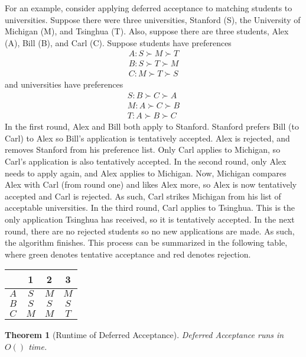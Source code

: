 \documentclass[dvipsnames]{article}
\newtheorem{theorem}{Theorem}[section]
\theoremstyle{definition}
\theoremstyle{remark}
\begin{document}
For an example, consider applying deferred acceptance to matching students to universities. Suppose there were three universities, Stanford (S), the University of Michigan (M), and Tsinghua (T). Also, suppose there are three students, Alex (A), Bill (B), and Carl (C).  Suppose students have preferences
\begin{align*}
	A: S \succ M \succ T \\
	B: S \succ T \succ M \\
	C: M \succ T \succ S
\end{align*}
and universities have preferences
\begin{align*}
	S: B \succ C \succ A \\
	M: A \succ C \succ B \\
	T: A \succ B \succ C
\end{align*}
In the first round, Alex and Bill both apply to Stanford. Stanford prefers Bill (to Carl) to Alex so Bill's application is tentatively accepted. Alex is rejected, and removes Stanford from his preference list. Only Carl applies to Michigan, so Carl's application is also tentatively accepted. In the second round, only Alex needs to apply again, and Alex applies to Michigan. Now, Michigan compares Alex with Carl (from round one) and likes Alex more, so Alex is now tentatively accepted and Carl is rejected. As such, Carl strikes Michigan from his list of acceptable universities. In the third round, Carl applies to Tsinghua. This is the only application Tsinghua has received, so it is tentatively accepted. In the next round, there are no rejected students so no new applications are made. As such, the algorithm finishes. This process can be summarized in the following table, where green denotes tentative acceptance and red denotes rejection.

\begin{center}
	\begin{tabular}{ |c||c|c|c| } 	
		\hline
		& 1& 2 & 3 \\ 
		\hline
		\hline
		$A$ & \color{Red}$S$& \color{Green}$M$ & \color{Green}$M$  \\ 
		\hline
		$B$ & \color{Green}$S$ & \color{Green}$S$ & \color{Green}$S$\\ 
		\hline
		$C$ & \color{Green}$M$ & \color{Red}$M$ & \color{Green}$T$\\ 
		\hline
	\end{tabular}
\end{center} 

\begin{theorem}[Runtime of Deferred Acceptance]
	Deferred Acceptance runs in $O()$ time.
\end{theorem}
\end{document}
